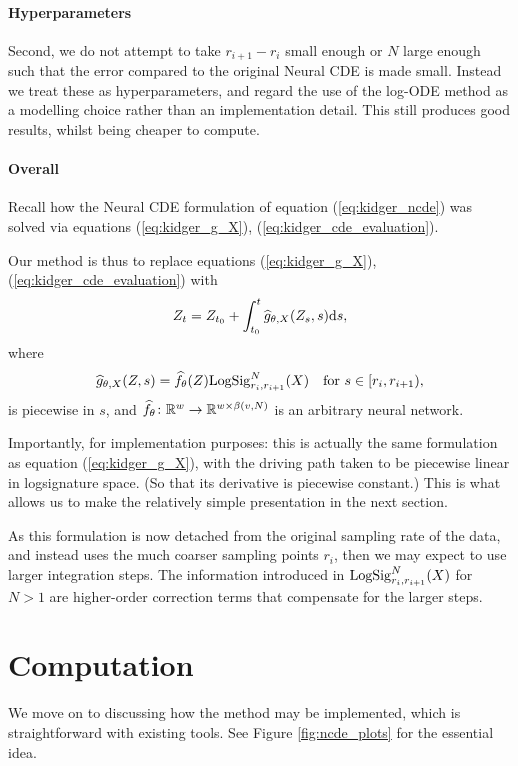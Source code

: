 \paragraph{Hyperparameters} Second, we do not attempt to take $r_{i+1} - r_{i}$ small enough or $N$ large enough such that the error compared to the original Neural CDE is made small. Instead we treat these as hyperparameters, and regard the use of the log-ODE method as a modelling choice rather than an implementation detail. This still produces good results, whilst being cheaper to compute.

\paragraph{Overall} Recall how the Neural CDE formulation of equation (\ref{eq:kidger_ncde}) was solved via equations (\ref{eq:kidger_g_X}), (\ref{eq:kidger_cde_evaluation}).

Our method is thus to replace equations (\ref{eq:kidger_g_X}), (\ref{eq:kidger_cde_evaluation}) with
\begin{equation}
    Z_t = Z_{t_0} + \int^{t}_{t_0} \widehat{g}_{\theta, X}(Z_s, s) \mathrm{d} s,
\end{equation}
where
\begin{equation*}
    \widehat{g}_{\theta, X}(Z, s) = \widehat{f}_\theta(Z) \mathrm{LogSig}_{r_i, r_{i+1}}^N(X) \quad \text{for } s \in [r_i, r_{i + 1}),
\end{equation*}
is piecewise in $s$, and $\widehat{f}_\theta \colon \mathbb{R}^w \to \mathbb{R}^{w \times \beta(v, N)}$ is an arbitrary neural network.

Importantly, for implementation purposes: this is actually the same formulation as equation (\ref{eq:kidger_g_X}), with the driving path taken to be piecewise linear in logsignature space. (So that its derivative is piecewise constant.) This is what allows us to make the relatively simple presentation in the next section.

As this formulation is now detached from the original sampling rate of the data, and instead uses the much coarser sampling points $r_i$, then we may expect to use larger integration steps. The information introduced in $\mathrm{LogSig}_{r_i, r_{i+1}}^N(X)$ for $N>1$ are higher-order correction terms that compensate for the larger steps.

\section{Computation}
We move on to discussing how the method may be implemented, which is straightforward with existing tools. See Figure \ref{fig:ncde_plots} for the essential idea.

